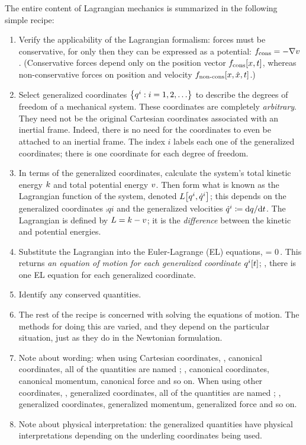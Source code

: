 The entire content of Lagrangian mechanics is summarized in the following simple recipe:
\begin{enumerate}
\item Verify the applicability of the Lagrangian formalism: forces must be conservative, for only then they can be expressed as a potential: $f_\text{cons} = -\nabla v$. (Conservative forces depend only on the position vector $f_\text{cons}\!\left[{x,t}\right]$, whereas non-conservative forces on position and velocity $f_\text{non-cons}\!\left[{x, \dot{x},t}\right]$.)
%
\item Select generalized coordinates $\left\lbrace{{{q}^{i}}:{i = 1,2,\dotsc}}\right\rbrace$ to describe the degrees of freedom of a mechanical system. These coordinates are completely \emph{arbitrary}. They need not be the original Cartesian coordinates associated with an inertial frame. Indeed, there is no need for the coordinates to even be attached to an inertial frame. The index $i$ labels each one of the generalized coordinates; there is one coordinate for each degree of freedom.
%
\item In terms of the generalized coordinates, calculate the system's total kinetic energy $k$ and total potential energy $v$. Then form what is known as the Lagrangian function of the system, denoted $L\!\left[{{q}^{i}, {\dot{q}}^{i}}\right]$; this depends on the generalized coordinates $\comp qi$ and the generalized velocities ${\dot{q}}^{i} \coloneqq \text{d} q/\text{d} t$. The Lagrangian is defined by $L = k - v$; it is the \emph{difference} between the kinetic and potential energies.
%
\item Substitute the Lagrangian into the Euler-Lagrange (EL) equations,
\beq
{} = 0\,.
\eeq
This returns \emph{an equation of motion for each generalized coordinate ${q}^{i}\!\left[{t}\right]$}; \ie, there is one EL equation for each generalized coordinate.
%
\item Identify any conserved quantities.
%
\item The rest of the recipe is concerned with solving the equations of motion. The methods for doing this are varied, and they depend on the particular situation, just as they do in the Newtonian formulation.
%
\item Note about wording: when using Cartesian coordinates, \aka, canonical coordinates, all of the quantities are named ; \eg, canonical coordinates, canonical momentum, canonical force and so on. When using other coordinates, \aka, generalized coordinates, all of the quantities are named ; \eg, generalized coordinates, generalized momentum, generalized force and so on. 
%
\item Note about physical interpretation: the generalized quantities have physical interpretations depending on the underling coordinates being used.
\end{enumerate}

